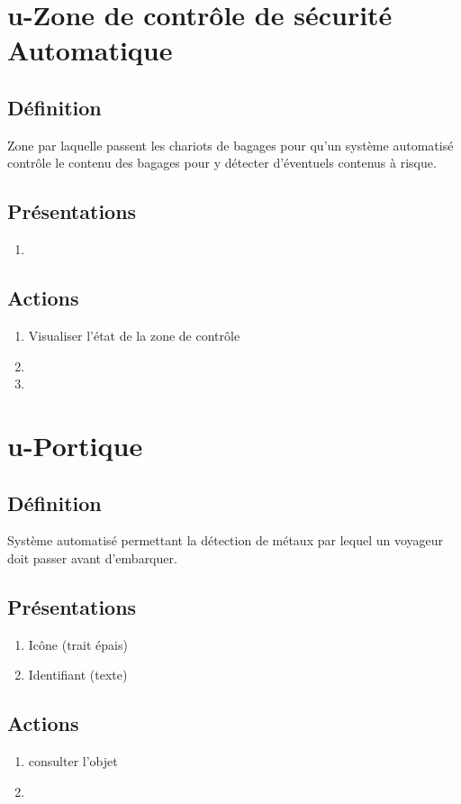 \section{u-Zone de contrôle de sécurité Automatique}
\subsection{Définition}
	Zone par laquelle passent les chariots de bagages pour qu'un système automatisé contrôle le contenu des bagages pour y
	détecter d'éventuels contenus à risque.

\subsection{Présentations}
\begin{enumerate}
	\item \rectetiquette
\end{enumerate}

\subsection{Actions}
\begin{enumerate}
	\item Visualiser l'état de la zone de contrôle
	\item {}
	\item \transit
\end{enumerate}

\section{u-Portique}
\subsection{Définition}
	Système automatisé permettant la détection de métaux par lequel un voyageur doit passer avant d'embarquer.

\subsection{Présentations}
\begin{enumerate}
	\item Icône (trait épais)
	\item Identifiant (texte)
\end{enumerate}

\subsection{Actions}
\begin{enumerate}
	\item consulter l'objet
	\item \etat
\end{enumerate}

